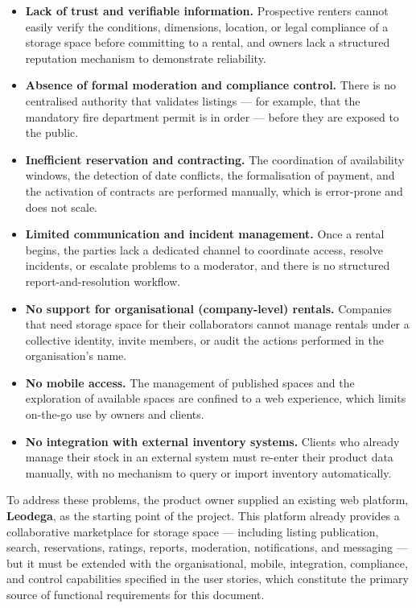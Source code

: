 \documentclass[11pt,a4paper,oneside]{report}
\begin{document}
\begin{itemize}
    \item \textbf{Lack of trust and verifiable information.} Prospective renters cannot easily verify the conditions, dimensions, location, or legal compliance of a storage space before committing to a rental, and owners lack a structured reputation mechanism to demonstrate reliability.
    \item \textbf{Absence of formal moderation and compliance control.} There is no centralised authority that validates listings --- for example, that the mandatory fire department permit is in order --- before they are exposed to the public.
    \item \textbf{Inefficient reservation and contracting.} The coordination of availability windows, the detection of date conflicts, the formalisation of payment, and the activation of contracts are performed manually, which is error-prone and does not scale.
    \item \textbf{Limited communication and incident management.} Once a rental begins, the parties lack a dedicated channel to coordinate access, resolve incidents, or escalate problems to a moderator, and there is no structured report-and-resolution workflow.
    \item \textbf{No support for organisational (company-level) rentals.} Companies that need storage space for their collaborators cannot manage rentals under a collective identity, invite members, or audit the actions performed in the organisation's name.
    \item \textbf{No mobile access.} The management of published spaces and the exploration of available spaces are confined to a web experience, which limits on-the-go use by owners and clients.
    \item \textbf{No integration with external inventory systems.} Clients who already manage their stock in an external system must re-enter their product data manually, with no mechanism to query or import inventory automatically.
\end{itemize}

To address these problems, the product owner supplied an existing web platform, \textbf{Leodega}, as the starting point of the project. This platform already provides a collaborative marketplace for storage space --- including listing publication, search, reservations, ratings, reports, moderation, notifications, and messaging --- but it must be extended with the organisational, mobile, integration, compliance, and control capabilities specified in the user stories, which constitute the primary source of functional requirements for this document.
\end{document}
